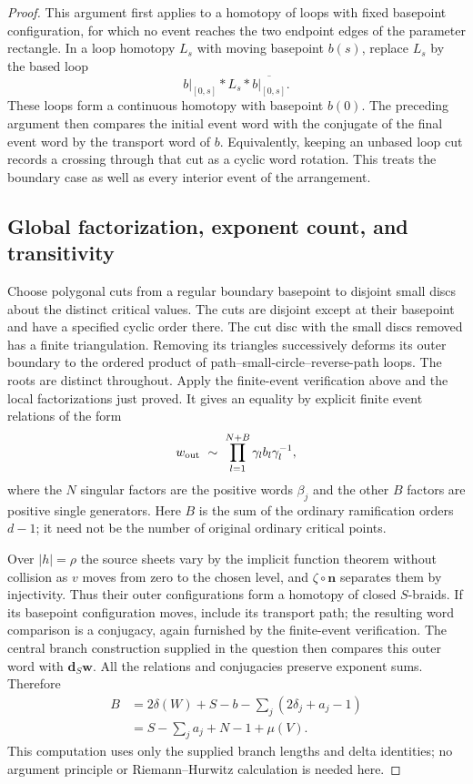 \documentclass[11pt,a4paper]{article}
\theoremstyle{remark}
\begin{document}
\begin{proof}
This argument first applies to a homotopy of loops with fixed basepoint
configuration, for which no event reaches the two endpoint edges of the
parameter rectangle.  In a loop homotopy $L_s$ with moving basepoint
$b(s)$, replace $L_s$ by the based loop
\[
 b|_{[0,s]}*L_s*\overline{b|_{[0,s]}}.
\]
These loops form a continuous homotopy with basepoint $b(0)$.
The preceding argument then compares the initial event word with the
conjugate of the final event word by the transport word of $b$.
Equivalently, keeping an unbased loop cut records a crossing through
that cut as a cyclic word rotation.  This treats the boundary case as
well as every interior event of the arrangement.

\subsection{Global factorization, exponent count, and transitivity}

Choose polygonal cuts from a regular boundary basepoint to disjoint small
discs about the distinct critical values.  The cuts are disjoint except
at their basepoint and have a specified cyclic order there.  The cut
disc with the small discs removed has a finite triangulation.  Removing
its triangles successively deforms its outer boundary to the ordered
product of path--small-circle--reverse-path loops.  The roots are
distinct throughout.  Apply the finite-event verification above and
the local factorizations just proved.  It gives an equality by explicit
finite event relations of the form
\[
 w_{\rm out}\ \sim\ \prod_{l=1}^{N+B}\gamma_l b_l\gamma_l^{-1},
\]
where the $N$ singular factors are the positive words $\beta_j$ and the
other $B$ factors are positive single generators.  Here
$B$ is the sum of the ordinary ramification orders $d-1$; it need not
be the number of original ordinary critical points.

Over $|h|=\rho$ the source sheets vary by the implicit function theorem
without collision as $v$ moves from zero to the chosen level, and
$\zeta\circ\boldsymbol n$ separates them by injectivity.  Thus their
outer configurations form a homotopy of closed $S$-braids.  If its
basepoint configuration moves, include its transport path; the resulting
word comparison is a conjugacy, again furnished by the finite-event
verification.  The central branch construction supplied in the question
then compares this outer word with $\mathbf d_S\mathbf w$.  All the
relations and conjugacies preserve exponent sums.  Therefore
\begin{align*}
 B
 &=2\delta(W)+S-b-\sum_j(2\delta_j+a_j-1)\\
 &=S-\sum_j a_j+N-1+\mu(V).
\end{align*}
This computation uses only the supplied branch lengths and delta
identities; no argument principle or Riemann--Hurwitz calculation is
needed here.


\end{proof}
\end{document}
